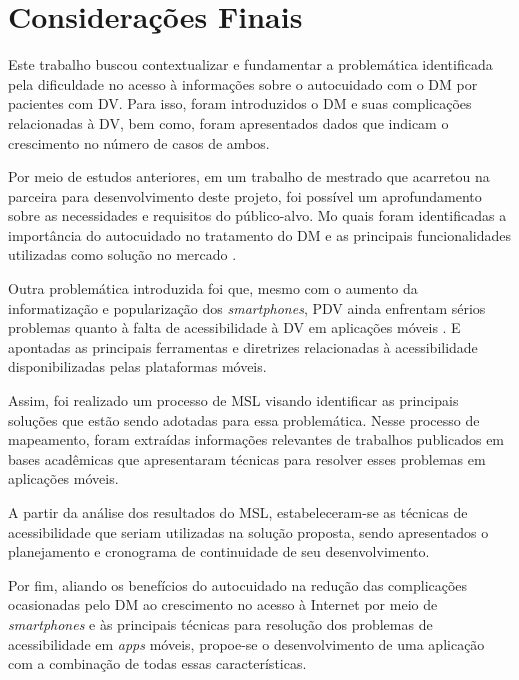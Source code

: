 \chapter{Considerações Finais}
\label{ch:conclusion}

Este trabalho buscou contextualizar e fundamentar a problemática identificada pela dificuldade
no acesso à informações sobre o autocuidado com o DM por pacientes com DV\@. Para isso, foram introduzidos
o DM e suas complicações relacionadas à DV, bem como, foram apresentados dados que indicam o crescimento no
número de casos de ambos.

Por meio de estudos anteriores, em um trabalho de mestrado que acarretou na parceira para desenvolvimento deste
projeto, foi possível um aprofundamento sobre as necessidades e requisitos do público-alvo.
Mo quais foram identificadas a importância do autocuidado no tratamento do DM e as principais funcionalidades utilizadas
como solução no mercado \cite{Sobral2021}.

Outra problemática introduzida foi que, mesmo com o aumento da informatização e popularização dos \emph{smartphones},
PDV ainda enfrentam sérios problemas quanto à falta de acessibilidade à DV em aplicações móveis \cite{Shera2021285}.
E apontadas as principais ferramentas e diretrizes relacionadas à acessibilidade disponibilizadas pelas plataformas móveis.

Assim, foi realizado um processo de MSL visando identificar as principais soluções que estão sendo adotadas
para essa problemática. Nesse processo de mapeamento, foram extraídas informações relevantes
de trabalhos publicados em bases acadêmicas que apresentaram técnicas para resolver esses problemas
em aplicações móveis.

A partir da análise dos resultados do MSL, estabeleceram-se as técnicas de acessibilidade que seriam utilizadas
na solução proposta, sendo apresentados o planejamento e cronograma de continuidade de seu desenvolvimento.

Por fim, aliando os benefícios do autocuidado na redução das complicações ocasionadas pelo DM
\cite{ADA2019} ao crescimento no acesso à Internet por meio de \emph{smartphones} \cite{CETIC_2021}
e às principais técnicas para resolução dos problemas de acessibilidade em \emph{apps} móveis,
propoe-se o desenvolvimento de uma aplicação com a combinação de todas essas características.